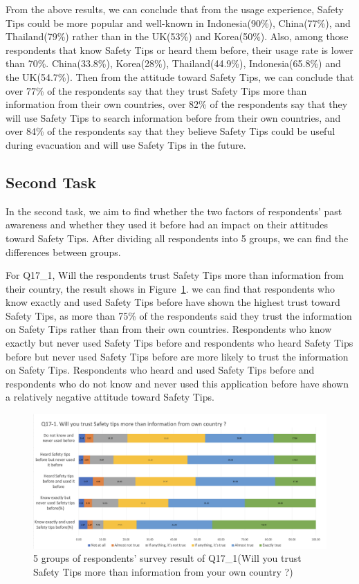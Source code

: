 From the above results, we can conclude that from the usage experience, Safety Tips could be more popular and well-known in Indonesia(90\%), China(77\%), and Thailand(79\%) rather than in the UK(53\%) and Korea(50\%). Also, among those respondents that know Safety Tips or heard them before, their usage rate is lower than 70\%. China(33.8\%), Korea(28\%), Thailand(44.9\%), Indonesia(65.8\%) and the UK(54.7\%). Then from the attitude toward Safety Tips, we can conclude that over 77\% of the respondents say that they trust Safety Tips more than information from their own countries, over 82\% of the respondents say that they will use Safety Tips to search information before from their own countries, and over 84\% of the respondents say that they believe Safety Tips could be useful during evacuation and will use Safety Tips in the future.

\subsection{Second Task}
In the second task, we aim to find whether the two factors of respondents' past awareness and whether they used it before had an impact on their attitudes toward Safety Tips. After dividing all respondents into 5 groups, we can find the differences between groups. 

For Q17\_1, Will the respondents trust Safety Tips more than information from their country, the result shows in Figure~\ref{fig19}. we can find that respondents who know exactly and used Safety Tips before have shown the highest trust toward Safety Tips, as more than 75\% of the respondents said they trust the information on Safety Tips rather than from their own countries. Respondents who know exactly but never used Safety Tips before and respondents who heard Safety Tips before but never used Safety Tips before are more likely to trust the information on Safety Tips. Respondents who heard and used Safety Tips before and respondents who do not know and never used this application before have shown a relatively negative attitude toward Safety Tips. 

\begin{figure}[h]
  \includegraphics[width=0.8\linewidth]{Figure/Figure19.jpg}
  \centering
  \caption[5 groups of respondents' survey result of Q17\_1]{5 groups of respondents' survey result of Q17\_1(Will you trust Safety Tips more than information from your own country ?)}
  \label{fig19}
\end{figure}

